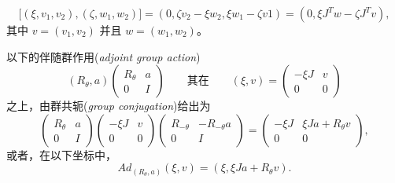 \documentclass[11pt,fontset=founder]{ctexart}
\begin{document}
\begin{equation*}
\lbrack (\xi ,v_{1},v_{2}),(\zeta ,w_{1},w_{2})]=(0,\zeta v_{2}-\xi
w_{2},\xi w_{1}-\zeta v1)=(0,\xi J^{T}w-\zeta J^{T}v),
\end{equation*}%
其中 $v=(v_{1},v_{2})$ 并且 $w=(w_{1},w_{2})$。

以下的伴随群作用(\emph{adjoint group action})%
\begin{equation*}
\left( R_{\theta },a\right) \left(
\begin{array}{cc}
R_{\theta } & a \\
0 & I%
\end{array}%
\right) \qquad \text{其在}\qquad (\xi ,v)=\left(
\begin{array}{cc}
-\xi J & v \\
0 & 0%
\end{array}%
\right)
\end{equation*}%
之上，由群共轭(\emph{group conjugation})给出为%
\begin{equation*}
\left(
\begin{array}{cc}
R_{\theta } & a \\
0 & I%
\end{array}%
\right) \left(
\begin{array}{cc}
-\xi J & v \\
0 & 0%
\end{array}%
\right) \left(
\begin{array}{cc}
R_{-\theta } & -R_{-\theta }a \\
0 & I%
\end{array}%
\right) =\left(
\begin{array}{cc}
-\xi J & \xi Ja+R_{\theta }v \\
0 & 0%
\end{array}%
\right) ,
\end{equation*}%
或者，在以下坐标中，
\begin{equation}
Ad_{\left( R_{\theta },a\right) }(\xi ,v)=(\xi ,\xi Ja+R_{\theta }v).
\label{adse2}
\end{equation}
\end{document}
